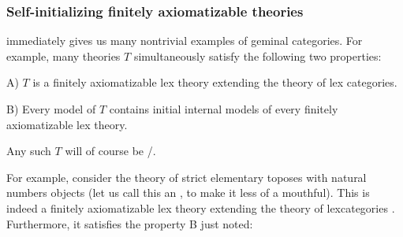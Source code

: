 \subsubsection{Self-initializing finitely axiomatizable theories}

 immediately gives us many nontrivial examples of geminal categories. For example, many theories $T$ simultaneously satisfy the following two properties:

A) $T$ is a finitely axiomatizable lex theory extending the theory of lex categories.

B) Every model of $T$ contains initial internal models of every finitely axiomatizable lex theory.

Any such $T$ will of course be \initogeminal/.

For example, consider the theory of strict elementary toposes with natural numbers objects (let us call this an , to make it less of a mouthful). This is indeed a finitely axiomatizable lex theory extending the theory of lexcategories . Furthermore, it satisfies the property B just noted:

